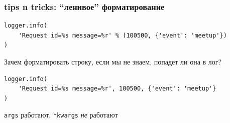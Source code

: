 \documentclass[aspectratio=169]{beamer}
\begin{document}
\begin{frame}[fragile]
  \frametitle{tips n tricks: ``ленивое'' форматирование}

  \begin{lstlisting}
logger.info(
    'Request id=%s message=%r' % (100500, {'event': 'meetup'})
)
  \end{lstlisting}

\pause

\vspace{0.5cm}
Зачем форматировать строку, если мы не знаем, попадет ли она в лог?

\pause

  \begin{lstlisting}
logger.info(
    'Request id=%s message=%r', 100500, {'event': 'meetup'}
)
  \end{lstlisting}

  \pause
  \begin{center}
    {\color{WGred}
      {\tt *args} работают, {\tt **kwargs} {\em не} работают
    }
  \end{center}

\end{frame}
\end{document}
